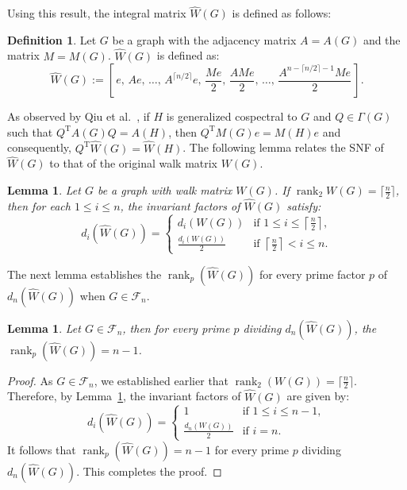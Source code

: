 \documentclass[12pt]{article}
\theoremstyle{plain}
\newtheorem{lemma}[theorem]{Lemma}
\theoremstyle{definition}
\newtheorem{definition}{Definition}[section]
\newcommand{\trans}{^{\mathrm{T}}}
\begin{document}
Using this result, the integral matrix $\hat{W}(G)$ is defined as follows:

\begin{definition} \cite{qiu2023smith}
Let $G$ be a graph with the adjacency matrix $A=A(G)$ and the matrix $M=M(G)$. $\hat{W}(G)$ is defined as:
$$
\hat{W}(G) := \left[\, e,\, Ae,\, \ldots,\, A^{\lceil n/2 \rceil}e,\,
\frac{Me}{2},\,
\frac{AMe}{2},\, \ldots,\, \frac{A^{n-\lceil n/2 \rceil-1}Me}{2}
\,\right].
$$

\end{definition}

As observed by Qiu et al.~\cite{qiu2023smith}, if $H$ is generalized cospectral to $G$ and $Q \in \Gamma(G)$ such that $Q\trans A(G) Q = A(H)$, then $Q\trans M(G) e = M(H) e$ and consequently, $Q\trans \hat{W}(G)=\hat{W}(H)$. The following lemma relates the SNF of $\hat{W}(G)$ to that of the original walk matrix $W(G)$.

\begin{lemma}
\label{lemma:what}
\cite{qiu2023smith}
Let $G$ be a graph with walk matrix $W(G)$. If $\operatorname{rank}_2{W(G)} = \lceil \frac{n}{2} \rceil$, then for each $1 \leq i \leq n$, the invariant factors of $\hat{W}(G)$ satisfy:
$$
d_i(\hat{W}(G)) = 
\begin{cases}
d_i(W(G)) & \text{if } 1 \leq i \leq \left\lceil \frac{n}{2} \right\rceil, \\
\frac{d_i(W(G))}{2} & \text{if } \left\lceil \frac{n}{2} \right\rceil < i \leq n.
\end{cases}
$$
\end{lemma}

The next lemma establishes the $\operatorname{rank}_p(\hat{W}(G))$ for every prime factor $p$ of $d_n(\hat{W}(G))$ when $G \in \mathcal{F}_n$.

\begin{lemma}
\label{lemma:rank}
Let $G \in \mathcal{F}_n$, then for every prime $p$ dividing $d_n(\hat{W}(G))$, the $\operatorname{rank}_p(\hat{W}(G)) = n-1$.
\end{lemma}

\begin{proof}
As $G\in\mathcal{F}_n$, we established earlier that $\operatorname{rank}_2(W(G))=\lceil \frac{n}{2} \rceil$. Therefore, by Lemma~\ref{lemma:what}, the invariant factors of $\hat{W}(G)$ are given by:
$$d_i(\hat{W}(G)) =
\begin{cases}
1 & \text{if } 1 \leq i \leq n-1, \\
\frac{d_n(W(G))}{2} & \text{if } i=n.
\end{cases}$$
It follows that $\operatorname{rank}_p(\hat{W}(G))=n-1$ for every prime $p$ dividing $d_n(\hat{W}(G))$. This completes the proof.
\end{proof}
\end{document}
